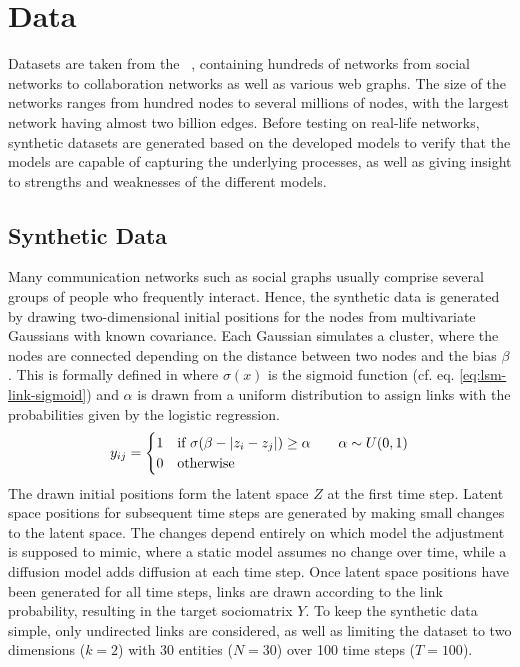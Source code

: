 \chapter{Data}\label{ch:Data}

Datasets are taken from the ~\cite{snapnets}, containing hundreds of networks from social networks to collaboration networks as well as various web graphs. The size of the networks ranges from hundred nodes to several millions of nodes, with the largest network having almost two billion edges.
Before testing on real-life networks, synthetic datasets are generated based on the developed models to verify that the models are capable of capturing the underlying processes, as well as giving insight to strengths and weaknesses of the different models. 

\section{Synthetic Data}

    Many communication networks such as social graphs usually comprise several groups of people who frequently interact. Hence, the synthetic data is generated by drawing two-dimensional initial positions for the nodes from multivariate Gaussians with known covariance. 
    Each Gaussian simulates a cluster, where the nodes are connected depending on the distance between two nodes and the bias $\beta$. This is formally defined in  where $\sigma(x)$ is the sigmoid function (cf. eq. \ref{eq:lsm-link-sigmoid}) and $\alpha$ is drawn from a uniform distribution to assign links with the probabilities given by the logistic regression.
    \begin{equation}\label{eq:synth-link}
        \sub(y) = 
        \begin{cases}
            1 & \text{if } \sigma(\beta - |z_i - z_j|) \geq \alpha \qquad \alpha\sim U(0,1) \\
            0 & \text{otherwise}
        \end{cases}
    \end{equation}
    The drawn initial positions form the latent space $Z$ at the first time step. Latent space positions for subsequent time steps are generated by making small changes to the latent space. The changes depend entirely on which model the adjustment is supposed to mimic, where a static model assumes no change over time, while a diffusion model adds diffusion at each time step. Once latent space positions have been generated for all time steps, links are drawn according to the link probability, resulting in the target sociomatrix $Y$. To keep the synthetic data simple, only undirected links are considered, as well as limiting the dataset to two dimensions ($k=2$) with 30 entities ($N=30$) over 100 time steps ($T=100$).
    
